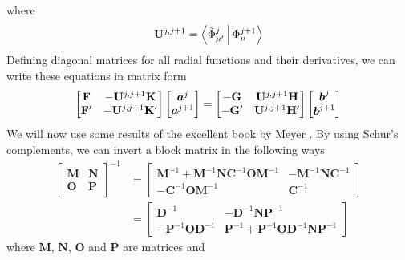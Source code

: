 where 
  \begin{equation}
    \mathbf{U}^{j,j+1} = \Braket{\tilde{\Phi}_{\mu'}^j|\Phi_\mu^{j+1}}
  \end{equation}
Defining diagonal matrices for all radial functions
and their derivatives, we can write these equations in matrix
form 
  \begin{equation}
    \label{eq:Smatrix.boundaryCond}
    \begin{bmatrix}
      \mathbf{F} 	& -\mathbf{U}^{j,j+1}\mathbf{K}	\\
      \mathbf{F}'	& -\mathbf{U}^{j,j+1}\mathbf{K}'
    \end{bmatrix}
    \begin{bmatrix}
      \boldsymbol{a}^j	\\	\boldsymbol{a}^{j+1}
    \end{bmatrix}
     = 
     \begin{bmatrix}
      -\mathbf{G}	& \mathbf{U}^{j,j+1}\mathbf{H}	\\
      -\mathbf{G}'	& \mathbf{U}^{j,j+1}\mathbf{H}'
     \end{bmatrix}
         \begin{bmatrix}
      \boldsymbol{b}^j	\\	\boldsymbol{b}^{j+1}
    \end{bmatrix}
  \end{equation}
We will now use some results of the excellent book by Meyer \cite{MEY2001}.
By using Schur's complements, we can invert a block matrix in the following
ways
  \begin{align}
    \begin{bmatrix} \mathbf{M} & \mathbf{N} \\ \mathbf{O} & \mathbf{P} \end{bmatrix}^{-1}
     &= 
    \begin{bmatrix}
     \mathbf{M}^{-1}+\mathbf{M}^{-1}\mathbf{NC}^{-1}\mathbf{OM}^{-1}	& -\mathbf{M}^{-1}\mathbf{NC}^{-1}	\\
     -\mathbf{C}^{-1}\mathbf{OM}^{-1}					& \mathbf{C}^{-1}
    \end{bmatrix}						\\
     &=
      \begin{bmatrix}
       \mathbf{D}^{-1}				& -\mathbf{D}^{-1}\mathbf{NP}^{-1}	\\
       -\mathbf{P}^{-1}\mathbf{OD}^{-1}		& \mathbf{P}^{-1}+\mathbf{P}^{-1}\mathbf{OD}^{-1}\mathbf{NP}^{-1}
      \end{bmatrix}
  \end{align}
where $\mathbf{M}$, $\mathbf{N}$, $\mathbf{O}$ and $\mathbf{P}$ are matrices and 
